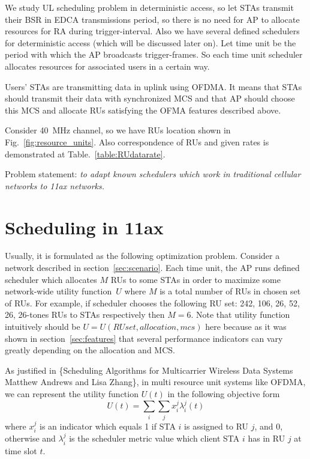 We study UL scheduling problem in deterministic access, so let STAs transmit their BSR in EDCA transmissions period, so there is no need for AP to allocate resources for RA during trigger-interval.
Also we have several defined schedulers for deterministic access (which will be discussed later on). 
Let time unit be the period with which the AP broadcasts trigger-frames.
So each time unit scheduler allocates resources for associated users in a certain way.

Users' STAs are transmitting data in uplink using OFDMA. 
It means that STAs should transmit their data with synchronized MCS and that AP should choose this MCS and allocate RUs satisfying the OFMA features described above. 

Consider \SI{40}{\MHz} channel, so we have RUs location shown in Fig.~\ref{fig:resource_units}. 
Also correspondence of RUs and given rates is demonstrated at Table.~\ref{table:RUdatarate}.

Problem statement: \textit{to adapt known schedulers which work in traditional cellular networks to 11ax networks.}

\section{Scheduling in 11ax}
\label{sec:scheduling}
Usually, it is formulated as the following optimization problem.
Consider a network described in section~\ref{sec:scenario}.
Each time unit, the AP runs defined scheduler which allocates $M$ RUs to some STAs in order to maximize some network-wide utility function~$U$ where $M$ is a total number of RUs in chosen set of RUs. 
For example, if scheduler chooses the following RU set: 242, 106, 26, 52, 26, 26-tones RUs to STAs respectively then $M = 6$. 
Note that utility function intuitively should be $U = U(RU set, allocation, mcs)$ here because as it was shown in section~\ref{sec:features} that several performance indicators can vary greatly depending on the allocation and MCS.

As justified in \{Scheduling Algorithms for Multicarrier Wireless
Data Systems
Matthew Andrews and Lisa Zhang\}, in multi resource unit systems like OFDMA, we can represent the utility function $U(t)$ in the following objective form
$$
U(t) = \sum_{i} \sum_{j} x_i^j \lambda_i^j (t)
$$
where $x_i^j$ is an indicator which equals 1 if STA $i$ is assigned to RU $j$, and 0, otherwise and $\lambda_i^j$ is the scheduler metric value which client STA $i$ has in RU $j$ at time slot $t$. 


